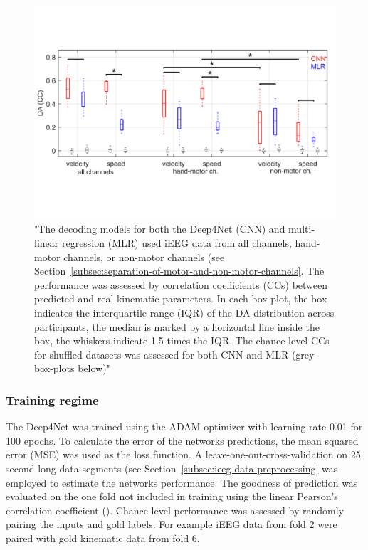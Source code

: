 \begin{figure}[!htpb]
\centering
   \includegraphics[width=0.8\linewidth]{img/ch2/hammer-decoding-acc}
   \caption[Orignial Deep4Net performance]{"The decoding models for both the Deep4Net (CNN) and multi-linear regression (MLR) used iEEG data from all channels, hand-motor channels, or non-motor channels (see Section~\ref{subsec:separation-of-motor-and-non-motor-channels}.
   The performance was assessed by correlation coefficients (CCs) between predicted and real kinematic parameters.
   In each box-plot, the box indicates the interquartile range (IQR) of the DA distribution across participants, the median is marked by a horizontal line inside the box, the whiskers indicate 1.5-times the IQR.
   The chance-level CCs for shuffled datasets was assessed for both CNN and MLR (grey box-plots below)"~\cite{Hammer-2021}}
    \label{fig:hammer-performance}
\end{figure}

\subsubsection{Training regime}
The Deep4Net was trained using the ADAM optimizer with learning rate 0.01 for 100 epochs.
To calculate the error of the networks predictions, the mean squared error (MSE) was used as the loss function.
A leave-one-out-cross-validation on 25 second long data segments (see Section~\ref{subsec:ieeg-data-preprocessing} was employed to estimate the networks performance.
The goodness of prediction was evaluated on the one fold not included in training using the linear Pearson's correlation coefficient (\cite{pearson-vii-1895}).
Chance level performance was assessed by randomly pairing the inputs and gold labels.
For example iEEG data from fold 2 were paired with gold kinematic data from fold 6.

